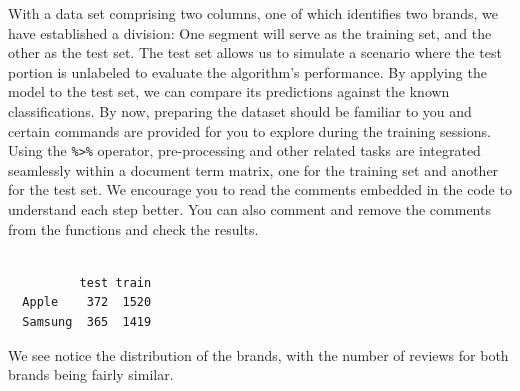 With a data set comprising two columns, one of which identifies two
brands, we have established a division: One segment will serve as the training
set, and the other as the test set. The test set allows us to simulate a
scenario where the test portion is unlabeled to evaluate the algorithm's
performance. By applying the model to the test set, we can compare its
predictions against the known classifications. By now, preparing the
dataset should be familiar to you and certain commands are provided for you to explore during the training sessions. Using
the \texttt{\%\textgreater{}\%} operator, pre-processing and other
related tasks are integrated seamlessly within a document term
matrix, one for the training set and another for the test
set. We encourage you to read the comments embedded in the code to
understand each step better. You can also comment and remove the comments from the
functions and check the results.

\begin{Shaded}
\begin{Highlighting}[]
\OtherTok{\textless{}{-}} 

\SpecialCharTok{$}\OtherTok{\textless{}{-}} \NormalTok{(}\NormalTok{(}\NormalTok{, }\NormalTok{), } \NormalTok{, } \NormalTok{(}\NormalTok{, }\NormalTok{))}

\SpecialCharTok{$}\SpecialCharTok{$}
\end{Highlighting}
\end{Shaded}

\begin{verbatim}
         
          test train
  Apple    372  1520
  Samsung  365  1419
\end{verbatim}

We see notice the distribution of the brands, with the number of reviews
for both brands being fairly similar.

